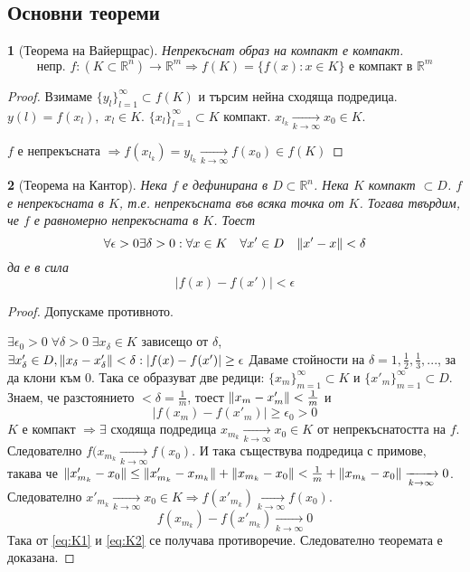 \documentclass[11pt]{article}
\numberwithin{equation}{section}
\numberwithin{figure}{section}
\numberwithin{table}{section}
\theoremstyle{plain}
\newtheorem{thm}{\protect\theoremname}[section]
\theoremstyle{definition}
\theoremstyle{remark}
\theoremstyle{definition}
\theoremstyle{remark}
\theoremstyle{plain}
\theoremstyle{definition}
\theoremstyle{definition}
\theoremstyle{plain}
\theoremstyle{plain}
\theoremstyle{plain}
\theoremstyle{definition}
\theoremstyle{plain}
\providecommand{\theoremname}{Теорема}
\DeclarePairedDelimiter\norm{\lVert}{\rVert}
\newcommand*{\R}{\mathbb{R}}
\begin{document}
\subsection{Основни теореми}

\begin{thm}[Теорема на Вайерщрас]
Непрекъснат образ на компакт е компакт.
$$\text{непр. } f: (K \subset \R^n) \rightarrow \R^m \Rightarrow f(K) = \{f(x):x\in K\} \text{ е компакт в }\R^m$$
\end{thm}
\begin{proof}
Взимаме $\{y_l\}_{l=1}^\infty \subset f(K)$ и търсим нейна сходяща подредица. $y(l) = f(x_l), \; x_l \in K$. $\{x_l\}_{l=1}^\infty \subset K$ компакт. $x_{l_k} \xrightarrow[k \rightarrow \infty]{} x_0 \in K$.

$f$ е непрекъсната $\Rightarrow f(x_{l_k}) = y_{l_k} \xrightarrow[k \rightarrow \infty]{} f(x_0)\in f(K)$
\end{proof}

\begin{thm}[Теорема на Кантор]
Нека $f$ е дефинирана в $D \subset \R^n$. Нека $K$ компакт $\subset D$.
$f$ е непрекъсната в $K$, т.е. непрекъсната във всяка точка от $K$.
Тогава твърдим, че $f$ е равномерно непрекъсната в $K$. Тоест
$$\forall \epsilon >0 \exists \delta >0 : \forall x \in K \quad \forall x' \in D \quad \norm{x'-x}<\delta$$
да е в сила
$$|f(x)-f(x')|<\epsilon$$
\end{thm}

\begin{proof}
Допускаме противното.

$\exists \epsilon_0 >0 \; \forall \delta >0 \; \exists x_\delta \in K$ зависещо от $\delta$, $\exists x'_\delta \in D, \norm{x_\delta - x'_\delta}<\delta : |f(x)-f(x')|\geq \epsilon$
Даваме стойности на $\delta = 1, \frac{1}{2}, \frac{1}{3}, ...$, за да клони към 0. Така се образуват две редици: $\{x_m\}_{m=1}^\infty \subset K$ и $\{x'_m\}_{m=1}^\infty \subset D$.
Знаем, че разстоянието $< \delta = \frac{1}{m}$, тоест $\norm{x_m - x'_m}<\frac{1}{m}$ и
\begin{equation} \label{eq:K1}
|f(x_m) - f(x'_m)|\geq \epsilon_0 >0
\end{equation}
$K$ е компакт $\Rightarrow \exists $ сходяща подредица $x_{m_k} \xrightarrow[k \rightarrow \infty]{} x_0 \in K$ от непрекъснатостта на $f$. Следователно $f(x_{m_k} \xrightarrow[k \rightarrow \infty]{} f(x_0)$. И така съществува подредица с примове, такава че $\norm{x'_{m_k}-x_0}\leq \norm{x'_{m_k}-x_{m_k}} + \norm{x_{m_k} - x_0} < \frac{1}{m} + \norm{x_{m_k}-x_0} \xrightarrow[k \rightarrow \infty]{} 0$. Следователно $x'_{m_k} \xrightarrow[k \rightarrow \infty]{} x_0 \in K \Rightarrow f(x'_{m_k}) \xrightarrow[k \rightarrow \infty]{} f(x_0)$.
\begin{equation} \label{eq:K2}
f(x_{m_k}) - f(x'_{m_k}) \xrightarrow[k \rightarrow \infty]{} 0
\end{equation}
Така от \eqref{eq:K1} и \eqref{eq:K2} се получава противоречие. Следователно теоремата е доказана.
\end{proof}
\end{document}
